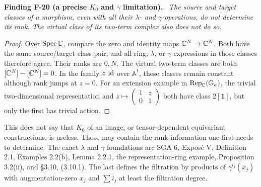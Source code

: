 \documentclass[11pt]{article}
\newcommand{\Spec}{\operatorname{Spec}}\newcommand{\rank}{\operatorname{rank}}
\newenvironment{finding}[2]{\par\medskip\noindent\textbf{Finding #1 (#2).}\ \itshape}{\par\medskip}
\begin{document}
\begin{finding}{F-20}{a precise $K_0$ and $\gamma$ limitation}
The source and target classes of a morphism, even with all their
$\lambda$- and $\gamma$-operations, do not determine its rank.
The virtual class of its two-term complex also does not do so.
\end{finding}
\begin{proof}
Over $\Spec\C$, compare the zero and identity maps
$\mathbb C^N\to\mathbb C^N$. Both have the same source/target class pair,
and all ring, $\lambda$, or $\gamma$ expressions in those
classes therefore agree. Their ranks are $0,N$.
The virtual two-term classes are both $[\mathbb C^N]-[\mathbb C^N]=0$.
In the family $z\,\operatorname{id}$ over $\mathbb A^1$, these classes remain
constant although rank jumps at $z=0$.
For an extension example in $\operatorname{Rep}_\mathbb C(\mathbb G_a)$,
the trivial two-dimensional representation and
$z\mapsto\left(\begin{smallmatrix}1&z\\0&1\end{smallmatrix}\right)$
both have class $2[\mathbf1]$, but only the first has trivial action.
\end{proof}
This does not say that $K_0$ of an image, or tensor-dependent
equivariant constructions, is useless. Those may contain the
rank information one first needs to determine.
The exact $\lambda$ and $\gamma$ foundations are SGA 6,
Expos\'e V, Definition 2.1, Examples 2.2(b), Lemma 2.2.1,
the representation-ring example, Proposition 3.2(ii), and
\S3.10, (3.10.1). The last defines the filtration by products
of $\gamma^{i_j}(x_j)$ with augmentation-zero $x_j$ and
$\sum i_j$ at least the filtration degree.
\end{document}
